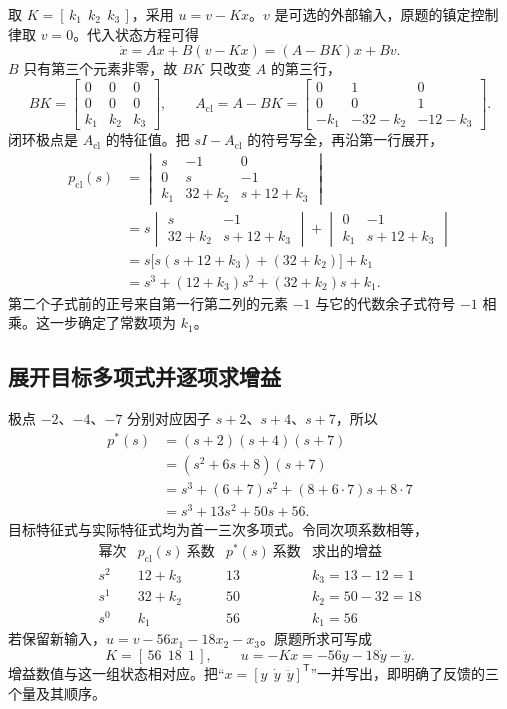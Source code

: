 取 $K=[\,k_1\ \ k_2\ \ k_3\,]$，采用 $u=v-Kx$。$v$ 是可选的外部输入，原题的镇定控制律取 $v=0$。代入状态方程可得
\[
    \dot x=Ax+B(v-Kx)=(A-BK)x+Bv .
\]
$B$ 只有第三个元素非零，故 $BK$ 只改变 $A$ 的第三行，
\[
    BK=\begin{bmatrix}0&0&0\\0&0&0\\k_1&k_2&k_3\end{bmatrix},\qquad
    A_{\mathrm{cl}}=A-BK
       =\begin{bmatrix}0&1&0\\0&0&1\\-k_1&-32-k_2&-12-k_3\end{bmatrix}.
\]
闭环极点是 $A_{\mathrm{cl}}$ 的特征值。把 $sI-A_{\mathrm{cl}}$ 的符号写全，再沿第一行展开，
\[
\begin{aligned}
    p_{\mathrm{cl}}(s)
       &=\begin{vmatrix}
           s&-1&0\\0&s&-1\\k_1&32+k_2&s+12+k_3
         \end{vmatrix}\\
       &=s\begin{vmatrix}s&-1\\32+k_2&s+12+k_3\end{vmatrix}
           +\begin{vmatrix}0&-1\\k_1&s+12+k_3\end{vmatrix}\\
       &=s\bigl[s(s+12+k_3)+(32+k_2)\bigr]+k_1\\
       &=s^3+(12+k_3)s^2+(32+k_2)s+k_1.
\end{aligned}
\]
第二个子式前的正号来自第一行第二列的元素 $-1$ 与它的代数余子式符号 $-1$ 相乘。这一步确定了常数项为 $k_1$。

\subsection{展开目标多项式并逐项求增益}

极点 $-2$、$-4$、$-7$ 分别对应因子 $s+2$、$s+4$、$s+7$，所以
\[
\begin{aligned}
    p^\ast(s)&=(s+2)(s+4)(s+7)\\
             &=(s^2+6s+8)(s+7)\\
             &=s^3+(6+7)s^2+(8+6\cdot7)s+8\cdot7\\
             &=s^3+13s^2+50s+56 .
\end{aligned}
\]
目标特征式与实际特征式均为首一三次多项式。令同次项系数相等，
\[
\begin{array}{c|c|c|c}
    \text{幂次} & p_{\mathrm{cl}}(s)\ \text{系数}
                &p^\ast(s)\ \text{系数} &\text{求出的增益}\\ \hline
    s^2&12+k_3&13&k_3=13-12=1\\
    s^1&32+k_2&50&k_2=50-32=18\\
    s^0&k_1&56&k_1=56
\end{array}
\]
若保留新输入，$u=v-56x_1-18x_2-x_3$。原题所求可写成
\[
    \boxed{K=[\,56\ \ 18\ \ 1\,],\qquad
           u=-Kx=-56y-18\dot y-\ddot y.}
\]
增益数值与这一组状态相对应。把“$x=[y\ \ \dot y\ \ \ddot y]^{\mathsf T}$”一并写出，即明确了反馈的三个量及其顺序。

